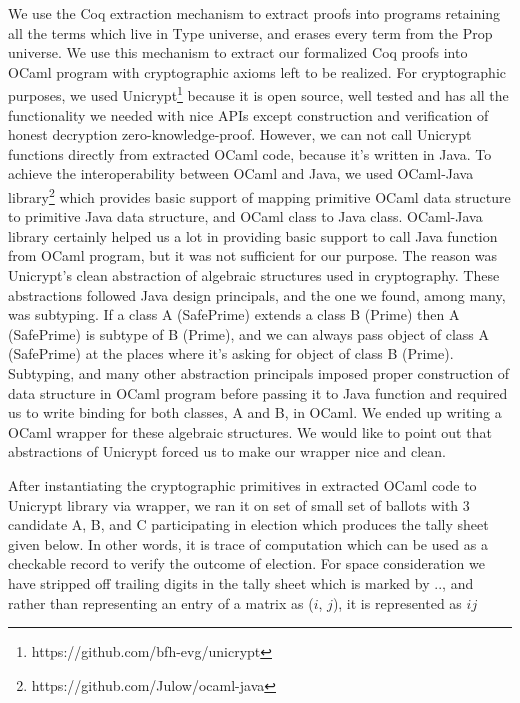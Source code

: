 \documentclass{llncs}
\begin{document}
We use the Coq extraction mechanism\cite{Letouzey:2003:NEC}  to extract
proofs into programs retaining all the terms which live in Type universe, 
and erases every term  from the Prop universe. We use this mechanism to 
extract our formalized Coq proofs into OCaml\cite{Leroy:2013:ORM} program 
with cryptographic axioms left to be realized. For cryptographic purposes, 
we used Unicrypt\footnote{https://github.com/bfh-evg/unicrypt}
because it is open source, well tested and has all the functionality 
we needed with nice APIs except construction and verification of 
honest decryption zero-knowledge-proof.
However, we can not call Unicrypt functions directly from extracted OCaml 
code, because it's written in Java. To achieve the interoperability 
between OCaml and Java, we used OCaml-Java library\footnote{ 
https://github.com/Julow/ocaml-java} which provides
 basic support of mapping  primitive OCaml data structure to
 primitive Java  data structure, and OCaml class to Java class. 
 OCaml-Java library certainly helped us a lot in providing basic 
 support to call Java function from OCaml program, but it was not 
 sufficient for
 our purpose. The reason was Unicrypt's clean abstraction of 
 algebraic structures used in cryptography. These abstractions followed 
 Java design principals, and the one we found, among many, was subtyping.
 If a class A (SafePrime) extends a class B (Prime) then 
 A (SafePrime) is subtype of B (Prime), 
 and we can always pass object of class A (SafePrime) at 
 the places where it's asking for object of class B (Prime). 
 Subtyping, and many other abstraction principals imposed 
 proper construction of data structure in OCaml program 
 before passing it to Java function and  
 required us to
 write binding for both classes, A and B, in OCaml. We ended up writing a
 OCaml wrapper for these algebraic structures. We would like to point out
 that abstractions of Unicrypt forced us to make our wrapper 
 nice and clean.
 
 After instantiating the  
 cryptographic primitives in extracted OCaml code 
 to Unicrypt library via wrapper, we ran it on set of
 small set of ballots with 3 candidate A, B, and C participating in election
 which produces the tally sheet given below. In other words, 
 it is trace of computation which can be used as a checkable record to verify
 the outcome of election. For space consideration we have stripped off 
 trailing digits in the tally sheet which is marked by $..$, and rather 
 than representing an entry of a matrix as ($i$, $j$), it is represented as 
 $ij$
 
\end{document}
